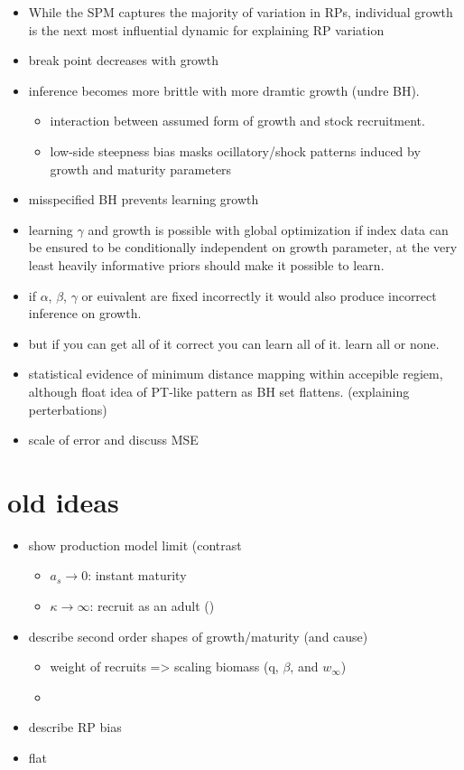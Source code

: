 \begin{itemize}
        \item While the SPM captures the majority of variation in RPs, individual growth is
	the next most influential dynamic for explaining RP variation
	\item break point decreases with growth
        \item inference becomes more brittle with more dramtic growth (undre BH).
        \begin{itemize}
                \item interaction between assumed form of growth and stock recruitment.
                \item low-side steepness bias masks ocillatory/shock patterns induced by growth and maturity parameters
        \end{itemize}
        \item misspecified BH prevents learning growth
	\item learning $\gamma$ and growth is possible with global optimization if index 
	data can be ensured to be conditionally independent on growth parameter, at 
	the very least heavily informative priors should make it possible to learn. %
        \item if $\alpha$, $\beta$, $\gamma$ or euivalent are fixed incorrectly it would also produce incorrect inference on growth.
	\item but if you can get all of it correct you can learn all of it. learn all or none.
	
	\item statistical evidence of minimum distance mapping within accepible regiem, 
	{\color{red}although float idea of PT-like pattern as BH set flattens. (explaining perterbations)}
	\item scale of error and discuss MSE
\end{itemize}

%
\section{old ideas}

%
\begin{itemize}
\item show production model limit (contrast %
\begin{itemize}
        \item $a_s\rightarrow0$: instant maturity
        \item $\kappa\rightarrow\infty$: recruit as an adult ()
\end{itemize}
\item describe second order shapes of growth/maturity (and cause)
\begin{itemize}
        \item weight of recruits => scaling biomass (q, $\beta$, and $w_\infty$)
        \item
\end{itemize}
\item describe RP bias
\item flat
\end{itemize}



